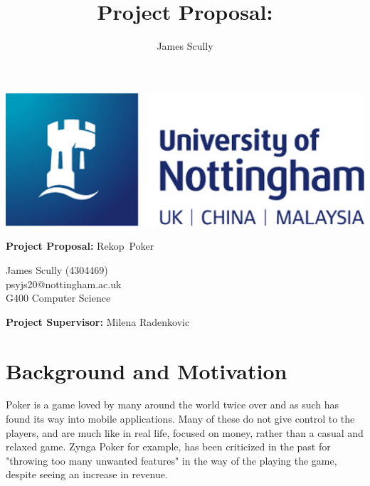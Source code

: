 \documentclass[11pt]{article}
\title{Project Proposal: \pt}
\author{James Scully}
\newcommand{\pn}{Rekop}
\begin{document}
{\selectfont


\hspace{0pt}

\vfill

\begin{center}
	\includegraphics[scale=0.4]{uni_logo}
	
	\vspace{1cm}
	
	{\Large \textbf{Project Proposal:} \pn \ Poker} \linebreak
	
	\begin{large}
		James Scully (4304469) \\
		psyjs20@nottingham.ac.uk \\
		G400 Computer Science \\
	\end{large}
	
\end{center}

\vfill

\begin{center}
	\textbf{Project Supervisor:} Milena Radenkovic
\end{center}

\hspace{0pt}

\pagebreak

\section*{Background and Motivation}

Poker is a game loved by many around the world twice over and as such has found its way into mobile applications. Many of these do not give control to the players, and are much like in real life, focused on money, rather than a casual and relaxed game. Zynga Poker for example, has been criticized in the past for "throwing too many unwanted features" in the way of the playing the game, despite seeing an increase in revenue. \cite{zynga_unwanted} \\

}
\end{document}
